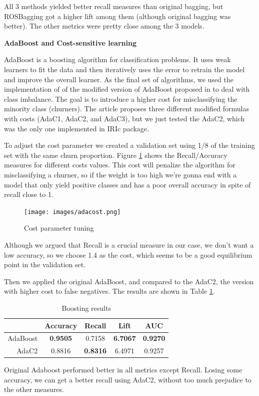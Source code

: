 \documentclass[12pt,letterpaper]{article}
\begin{document}
All 3 methods yielded better recall measures than original bagging, but ROSBagging got a higher lift among them (although original bagging was better). The other metrics were pretty close among the 3 models.

\textbf{AdaBoost and Cost-sensitive learning}

AdaBoost\cite{ada} is a boosting algorithm for classification problems. It uses weak learners to fit the data and then iteratively uses the error to retrain the model and improve the overall learner. As the final set of algorithms, we used the implementation of \cite{iric} of the modified version of AdaBoost proposed in \cite{ada} to deal with class imbalance. The goal is to introduce a higher cost for misclassifying the minority class (churners). The article proposes three different modified formulas with costs (AdaC1, AdaC2, and AdaC3), but we just tested the AdaC2, which was the only one implemented in IRIc package\cite{iric}.

To adjust the cost parameter we created a validation set using 1/8 of the training set with the same churn proportion. Figure \ref{adacost} shows the Recall/Accuracy measures for different costs values. This cost will penalize the algorithm for misclassifying a churner, so if the weight is too high we're gonna end with a model that only yield positive classes and has a poor overall accuracy in spite of recall close to 1.

\begin{figure}[!htb]
	\centering
	\texttt{[image: images/adacost.png]}
	\caption{Cost parameter tuning}
	\label{adacost}
\end{figure}
Although we argued that Recall is a crucial measure in our case, we don’t want a low accuracy, so we choose 1.4 as the cost, which seems to be a good equilibrium point in the validation set.

Then we applied the original AdaBoost, and compared to the AdaC2, the version with higher cost to false negatives. The results are shown in Table \ref{adab}.

\begin{table}[ht]
	\centering
	\addtolength{\tabcolsep}{6pt}
	\begin{tabular}{|r|cccc|}
		\hline
		& Accuracy & Recall & Lift & AUC \\ 
		\hline
		AdaBoost &\textbf{ 0.9505} & 0.7158 & \textbf{6.7067} & \textbf{0.9270} \\ 
		AdaC2 & 0.8816 & \textbf{0.8316} & 6.4971 & 0.9257 \\ 
		\hline
	\end{tabular}
\caption{Boosting results}
\label{adab}
\end{table}
Original Adaboost performed better in all metrics except Recall. Losing some accuracy, we can get a better recall using AdaC2, without too much prejudice to the other measures.
\end{document}
